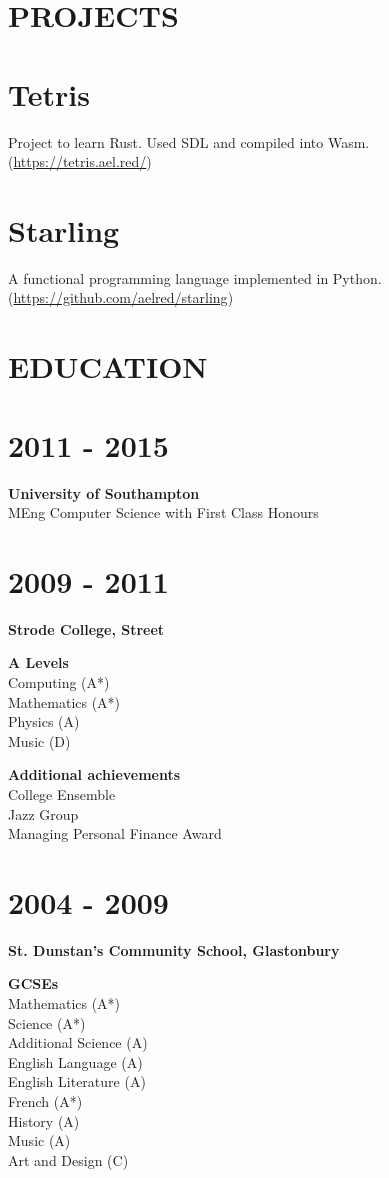 \documentclass[margin]{res}
\begin{document}
\begin{resume}
\section{PROJECTS}

\normalsize{\section{Tetris}}
Project to learn Rust. Used SDL and compiled into Wasm. (\href{https://tetris.ael.red/}{https://tetris.ael.red/})

\normalsize{\section{Starling}}
A functional programming language implemented in Python. (\href{https://github.com/aelred/starling}{https://github.com/aelred/starling})

\section{EDUCATION}
\normalsize{\section{2011 - 2015}}
{\bf University of Southampton} \\
MEng Computer Science with First Class Honours \\
\normalsize{\section{2009 - 2011}}
{\bf Strode College, Street}

{\bf A Levels} \\
Computing (A*) \\
Mathematics (A*) \\
Physics (A) \\
Music (D)

{\bf Additional achievements} \\
College Ensemble \\
Jazz Group \\
Managing Personal Finance Award

\normalsize{\section{2004 - 2009}}
{\bf St. Dunstan's Community School, Glastonbury}

{\bf GCSEs} \\
Mathematics (A*) \\
Science (A*) \\
Additional Science (A) \\
English Language (A) \\
English Literature (A) \\
French (A*) \\
History (A) \\
Music (A) \\
Art and Design (C)


\end{resume}
\end{document}
